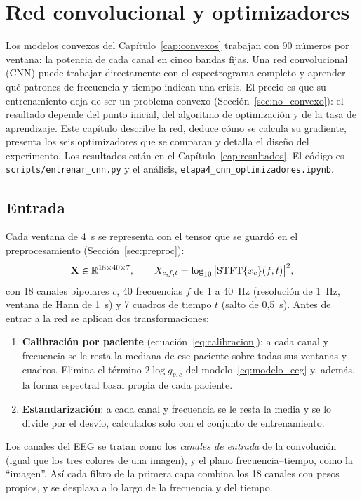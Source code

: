 \chapter{Red convolucional y optimizadores}
\label{cap:cnn}

Los modelos convexos del Capítulo~\ref{cap:convexos} trabajan con 90 números por ventana: la potencia de cada canal
en cinco bandas fijas. Una red convolucional (CNN) puede trabajar directamente con el espectrograma completo y aprender
qué patrones de frecuencia y tiempo indican una crisis. El precio es que su entrenamiento deja de ser un problema convexo
(Sección~\ref{sec:no_convexo}): el resultado depende del punto inicial, del algoritmo de optimización y de la tasa de
aprendizaje. Este capítulo describe la red, deduce cómo se calcula su gradiente, presenta los seis optimizadores que se
comparan y detalla el diseño del experimento. Los resultados están en el Capítulo~\ref{cap:resultados}. El código es
\texttt{scripts/entrenar\_cnn.py} y el análisis, \texttt{etapa4\_cnn\_optimizadores.ipynb}.

\section{Entrada}
\label{sec:cnn_entrada}

Cada ventana de 4~s se representa con el tensor que se guardó en el preprocesamiento (Sección~\ref{sec:preproc}):
\begin{equation}
  \mathbf{X} \in \mathbb{R}^{18 \times 40 \times 7}, \qquad
  X_{c,f,t} = \log_{10}\big|\mathrm{STFT}\{x_c\}(f, t)\big|^2,
\end{equation}
con 18 canales bipolares $c$, 40 frecuencias $f$ de 1 a 40~Hz (resolución de 1~Hz, ventana de Hann de 1~s) y 7 cuadros de
tiempo $t$ (salto de 0,5~s). Antes de entrar a la red se aplican dos transformaciones:
\begin{enumerate}
  \item \textbf{Calibración por paciente} (ecuación~\eqref{eq:calibracion}): a cada canal y frecuencia se le resta la mediana de
        ese paciente sobre todas sus ventanas y cuadros. Elimina el término $2\log g_{p,c}$ del modelo~\eqref{eq:modelo_eeg}
        y, además, la forma espectral basal propia de cada paciente.
  \item \textbf{Estandarización}: a cada canal y frecuencia se le resta la media y se lo divide por el desvío, calculados
        solo con el conjunto de entrenamiento.
\end{enumerate}
Los canales del EEG se tratan como los \emph{canales de entrada} de la convolución (igual que los tres colores de una
imagen), y el plano frecuencia--tiempo, como la ``imagen''. Así cada filtro de la primera capa combina los 18 canales
con pesos propios, y se desplaza a lo largo de la frecuencia y del tiempo.

